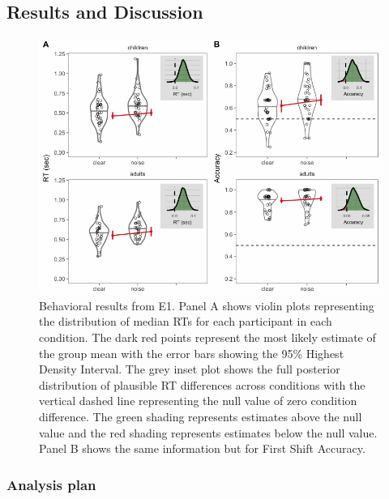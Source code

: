 \documentclass[10pt, letterpaper]{article}
\newenvironment{CodeChunk}{}{}
\begin{document}
\subsection{Results and Discussion}\label{results-and-discussion}

\begin{CodeChunk}
\begin{figure}[t]

{\centering \includegraphics[width=0.7\linewidth]{figs/noise_acc_rt_e1_plot-1} 

}

\caption[Behavioral results from E1]{Behavioral results from E1. Panel A shows violin plots representing the distribution of median RTs for each participant in each condition. The dark red points represent the most likely estimate of the group mean with the error bars showing the 95\% Highest Density Interval. The grey inset plot shows the full posterior distribution of plausible RT differences across conditions with the vertical dashed line representing the null value of zero condition difference. The green shading represents estimates above the null value and the red shading represents estimates below the null value. Panel B shows the same information but for First Shift Accuracy.}\label{fig:noise_acc_rt_e1_plot}
\end{figure}
\end{CodeChunk}

\subsubsection{Analysis plan}\label{analysis-plan}
\end{document}
